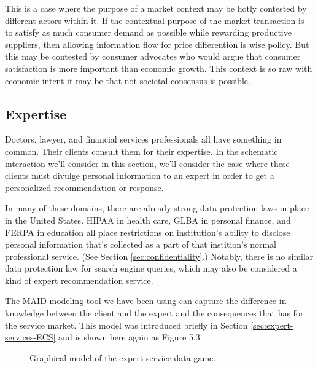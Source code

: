 \documentclass[../thesis.tex]{subfiles}
\begin{document}
This is a case where the purpose of a market context
may be hotly contested by different actors within it.
If the contextual purpose of the market
transaction is to satisfy as much consumer demand as
possible while rewarding productive suppliers,
then allowing information flow for price differention
is wise policy.
But this may be contested by consumer advocates who
would argue that consumer satisfaction is more important
than economic growth.
This context is so raw with economic intent it may be
that not societal consensus is possible.

\subsection{Expertise}
\label{sec:expertise}

Doctors, lawyer, and financial services professionals
all have something in common.
Their clients consult them for their expertise.
In the schematic interaction we'll consider in this
section, we'll consider the case where these clients
must divulge personal information to an expert in
order to get a personalized recommendation or response.

In many of these domains, there are already strong data
protection laws in place in the United States. 
HIPAA in health care,
GLBA in personal finance, and FERPA in education all
place restrictions on institution's ability to disclose personal
information that's collected as a part of that instition's
normal professional service. (See Section \ref{sec:confidentiality}.)
Notably, there is no similar data protection law for search
engine queries, which may also be considered a kind of expert
recommendation service.

The MAID modeling tool we have been using can capture
the difference in knowledge between the client and
the expert and the consequences that has for the service
market.
This model was introduced briefly in Section \ref{sec:expert-services-ECS}
and is shown here again as Figure 5.3.

\begin{figure}
  \label{fig:expert-data-game}
\begin{center}
\end{center}
\caption{Graphical model of the expert service data game.}
\end{figure}
\end{document}
